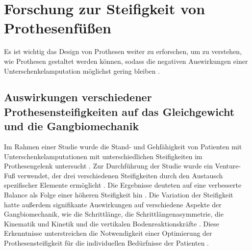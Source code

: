 \section{Forschung zur Steifigkeit von Prothesenfüßen}
Es ist wichtig das Design von Prothesen weiter zu erforschen, um zu verstehen, wie Prothesen gestaltet werden können, sodass die negativen Auswirkungen einer Unterschenkelamputation möglichst gering bleiben \cite{Major.2014}.

\subsection{Auswirkungen verschiedener Prothesensteifigkeiten auf das Gleichgewicht und die Gangbiomechanik}
Im Rahmen einer Studie wurde die Stand- und Gehfähigkeit von Patienten mit Unterschenkelamputationen mit unterschiedlichen Steifigkeiten im Prothesengelenk untersucht \cite{Vaca.2022}. Zur Durchführung der Studie wurde ein Venture-Fuß verwendet, der drei verschiedenen Steifigkeiten durch den Austausch spezifischer Elemente ermöglicht \cite{Vaca.2022}. Die Ergebnisse deuteten auf eine verbesserte Balance als Folge einer höheren Steifigkeit hin \cite{Vaca.2022}. Die Variation der Steifigkeit hatte außerdem signifikante Auswirkungen auf verschiedene Aspekte der Gangbiomechanik, wie die Schrittlänge, die Schrittlängenasymmetrie, die Kinematik und Kinetik und die vertikalen Bodenreaktionskräfte \cite{Vaca.2022}. Diese Erkenntnisse unterstreichen die Notwendigkeit einer Optimierung der Prothesensteifigkeit für die individuellen Bedürfnisse der Patienten \cite{Vaca.2022}.


